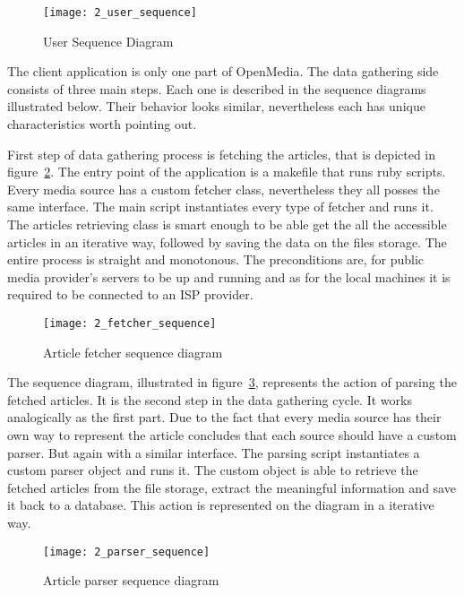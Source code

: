 \begin{figure}[!ht]
\centering
\texttt{[image: 2\_user\_sequence]}
\caption{User Sequence Diagram}\label{user_sequence}
\end{figure}

The client application is only one part of OpenMedia. The data gathering side consists of three main steps. Each one is described in the sequence diagrams illustrated below. Their behavior looks similar, nevertheless each has unique characteristics worth pointing out.

First step of data gathering process is fetching the articles, that is depicted in \mbox{figure \ref{fetcher_sequence}}. The entry point of the application is a makefile that runs ruby scripts. Every media source has a custom fetcher class, nevertheless they all posses the same interface. The main script instantiates every type of fetcher and runs it. The articles retrieving class is smart enough to be able get the all the accessible articles in an iterative way, followed by saving the data on the files storage. The entire process is straight and monotonous. The preconditions are, for public media provider's servers to be up and running and as for the local machines it is required to be connected to an ISP provider.

\begin{figure}[!ht]
\centering
\texttt{[image: 2\_fetcher\_sequence]}
\caption{Article fetcher sequence diagram}\label{fetcher_sequence}
\end{figure}

The sequence diagram, illustrated in \mbox{figure \ref{parser_sequence}}, represents the action of parsing the fetched articles. It is the second step in the data gathering cycle. It works analogically as the first part. Due to the fact that every media source has their own way to represent the article concludes that each source should have a custom parser. But again with a similar interface. The parsing script instantiates a custom parser object and runs it. The custom object is able to retrieve the fetched articles from the file storage, extract the meaningful information and save it back to a database. This action is represented on the diagram in a iterative way.

\begin{figure}[!ht]
\centering
\texttt{[image: 2\_parser\_sequence]}
\caption{Article parser sequence diagram}\label{parser_sequence}
\end{figure}


